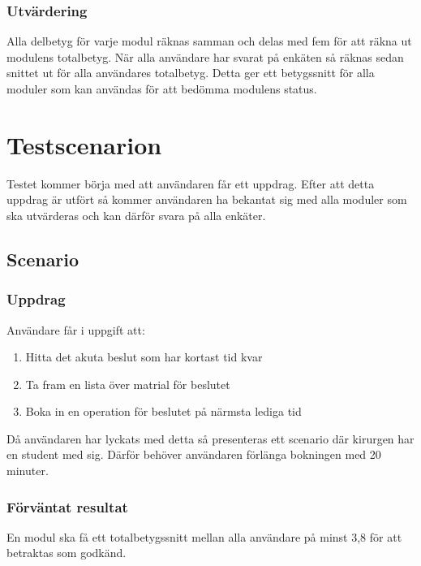 \subsubsection{Utvärdering}
Alla delbetyg för varje modul räknas samman och delas med fem för att räkna ut modulens totalbetyg.
När alla användare har svarat på enkäten så räknas sedan snittet ut för alla användares totalbetyg. Detta ger ett betygssnitt för alla moduler som kan användas för att bedömma modulens status.
\section{Testscenarion}
Testet kommer börja med att användaren får ett uppdrag. Efter att detta uppdrag är utfört så kommer användaren ha bekantat sig med alla moduler som ska utvärderas och kan därför svara på alla enkäter. 
\subsection{Scenario}
\subsubsection{Uppdrag}
Användare får i uppgift att:
\begin{enumerate}
	\item Hitta det akuta beslut som har kortast tid kvar
	\item Ta fram en lista över matrial för beslutet
	\item Boka in en operation för beslutet på närmsta lediga tid
\end{enumerate}
Då användaren har lyckats med detta så presenteras ett scenario där kirurgen har en student med sig. Därför behöver användaren förlänga bokningen med 20 minuter.
\subsubsection{Förväntat resultat}
En modul ska få ett totalbetygssnitt mellan alla användare på minst 3,8 för att betraktas som godkänd.
